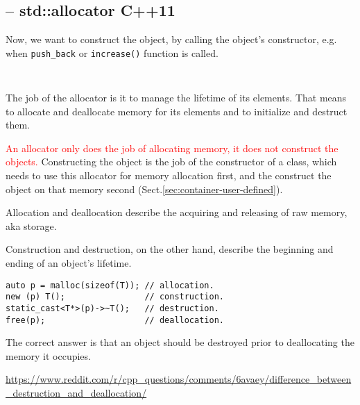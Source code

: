 \subsection{-- std::allocator C++11}

Now, we want to construct the object, by calling the object's constructor, e.g.
when \verb!push_back! or \verb!increase()! function is called.

\begin{lstlisting}


\end{lstlisting}

The job of the allocator is it to manage the lifetime of its elements. That
means to allocate and deallocate memory for its elements and to initialize and
destruct them.


\textcolor{red}{An allocator only does the job of allocating memory, it does not construct the objects.}
Constructing the object is the job of the constructor of a class, which needs to
use this allocator for memory allocation first, and the construct the object on
that memory second (Sect.\ref{sec:container-user-defined}).

\begin{mdframed}

Allocation and deallocation describe the acquiring and releasing of raw memory, aka storage. 

Construction and destruction, on the other hand, describe the beginning and
ending of an object's lifetime.

\begin{verbatim}
auto p = malloc(sizeof(T)); // allocation.
new (p) T();                // construction.
static_cast<T*>(p)->~T();   // destruction.
free(p);                    // deallocation.
\end{verbatim}

The correct answer is that an object should be destroyed prior to deallocating the memory it occupies.


\url{https://www.reddit.com/r/cpp_questions/comments/6avaey/difference_between_destruction_and_deallocation/}
\end{mdframed}

